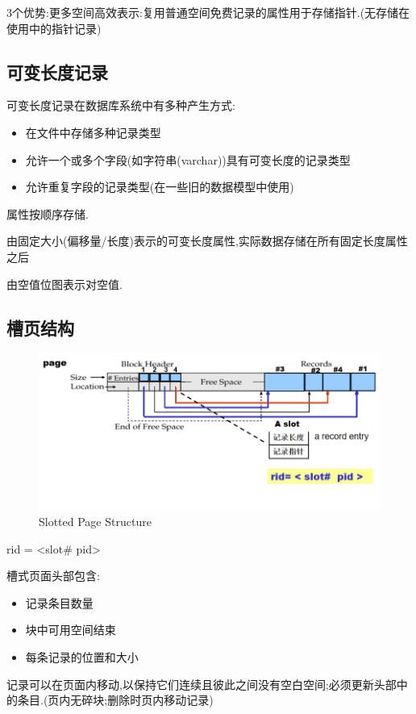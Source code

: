 3个优势:更多空间高效表示:复用普通空间免费记录的属性用于存储指针.(无存储在使用中的指针记录)

\subsection{可变长度记录}

可变长度记录在数据库系统中有多种产生方式:

\begin{itemize}
    \item 在文件中存储多种记录类型
    \item 允许一个或多个字段(如字符串(varchar))具有可变长度的记录类型
    \item 允许重复字段的记录类型(在一些旧的数据模型中使用)
\end{itemize}

属性按顺序存储.

由固定大小(偏移量/长度)表示的可变长度属性,实际数据存储在所有固定长度属性之后

由空值位图表示对空值.

\subsection{槽页结构}

\begin{figure}[H]
    \centering
    \includegraphics[width=0.8\linewidth]{image8.png}
    \caption{Slotted Page Structure}
    \label{}
\end{figure}

rid = <slot\# pid>

槽式页面头部包含:

\begin{itemize}
    \item 记录条目数量
    \item 块中可用空间结束
    \item 每条记录的位置和大小
\end{itemize}

记录可以在页面内移动,以保持它们连续且彼此之间没有空白空间;必须更新头部中的条目.(页内无碎块;删除时页内移动记录)

